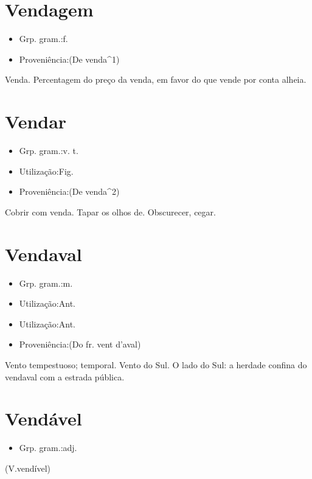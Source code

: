 \documentclass{article}
\begin{document}
\section{Vendagem}
\begin{itemize}
\item {Grp. gram.:f.}
\end{itemize}
\begin{itemize}
\item {Proveniência:(De \textunderscore venda\textunderscore ^1)}
\end{itemize}
Venda.
Percentagem do preço da venda, em favor do que vende por conta alheia.
\section{Vendar}
\begin{itemize}
\item {Grp. gram.:v. t.}
\end{itemize}
\begin{itemize}
\item {Utilização:Fig.}
\end{itemize}
\begin{itemize}
\item {Proveniência:(De \textunderscore venda\textunderscore ^2)}
\end{itemize}
Cobrir com venda.
Tapar os olhos de.
Obscurecer, cegar.
\section{Vendaval}
\begin{itemize}
\item {Grp. gram.:m.}
\end{itemize}
\begin{itemize}
\item {Utilização:Ant.}
\end{itemize}
\begin{itemize}
\item {Utilização:Ant.}
\end{itemize}
\begin{itemize}
\item {Proveniência:(Do fr. \textunderscore vent d'aval\textunderscore )}
\end{itemize}
Vento tempestuoso; temporal.
Vento do Sul.
O lado do Sul: \textunderscore a herdade confina do vendaval com a estrada pública\textunderscore .
\section{Vendável}
\begin{itemize}
\item {Grp. gram.:adj.}
\end{itemize}
(V.vendível)
\end{document}
